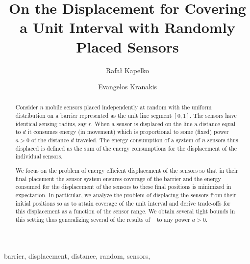 \documentclass[final,5p,times,twocolumn]{elsarticle_mod}
\begin{document}
\begin{frontmatter}

\title{On the Displacement for Covering a Unit Interval with Randomly Placed Sensors}

\author[pwr]{Rafa\l{} Kapelko}
\author[scs]{Evangelos Kranakis}
\address[pwr]{ Department of Computer Science, Faculty of Fundamental Problems of Technology, Wroc{\l}aw University of Technology, Poland}
\address[scs]{School of Computer Science, Carleton University, Ottawa, ON, Canada}
\begin{abstract}

Consider $n$ mobile sensors placed independently at random with the uniform distribution on a barrier represented as the unit line segment $[0,1]$. 
The sensors have identical sensing radius, say $r$. When a sensor is displaced on the line a distance equal to $d$ it consumes energy (in movement) which is proportional to some (fixed) 
power $a > 0$ of the distance $d$ traveled. The energy consumption of a system of $n$ sensors thus displaced is defined as the sum of the energy consumptions for the displacement 
of the individual sensors. 

We focus on the problem of energy efficient displacement of the sensors so that in their final placement the sensor system ensures coverage of the barrier and the energy consumed 
for the displacement of the sensors to these final positions is minimized in expectation. In particular, we analyze the problem of displacing the sensors from their initial positions 
so as to attain coverage of the unit interval and derive trade-offs for this displacement as a function of the sensor range. We obtain several tight bounds in this setting 
thus generalizing several of the results of ~\cite{spa_2013} to any power $a >0$.  


\end{abstract} 

\begin{keyword}
  barrier, displacement, distance, random, sensors,
\end{keyword}

\end{frontmatter}
\end{document}
